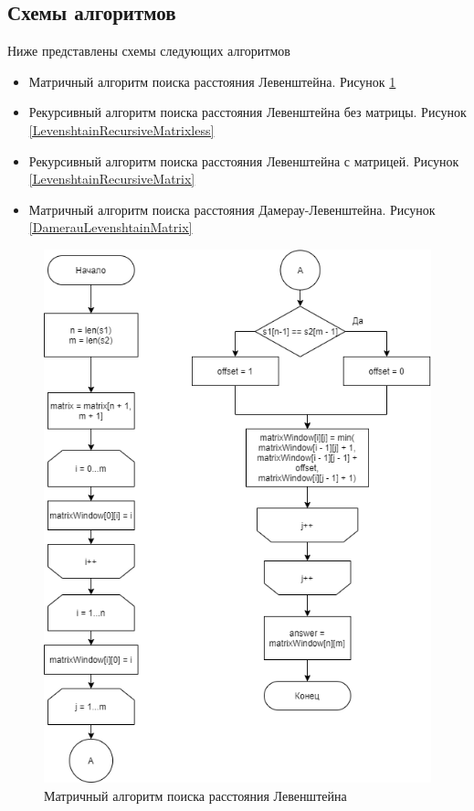 \documentclass{article}
\begin{document}
	 	\subsection{Схемы алгоритмов}
	 	Ниже представлены схемы следующих алгоритмов
	 	\begin{itemize}
	 		\item Матричный алгоритм поиска расстояния Левенштейна. Рисунок \ref{LevenshtainMatrix}
	 		\item Рекурсивный алгоритм поиска расстояния Левенштейна без матрицы. Рисунок \ref{LevenshtainRecursiveMatrixless}
	 		\item Рекурсивный алгоритм поиска расстояния Левенштейна с матрицей. Рисунок \ref{LevenshtainRecursiveMatrix}
	 		\item Матричный алгоритм поиска расстояния Дамерау-Левенштейна. Рисунок \ref{DamerauLevenshtainMatrix}
	 	\end{itemize}
	 	\begin{figure}
		 	\includegraphics[scale=0.9]{LevenshtainMatrix}
		 	\caption{Матричный алгоритм поиска расстояния Левенштейна}
		 	\label{LevenshtainMatrix}
	 	\end{figure}
\end{document}
